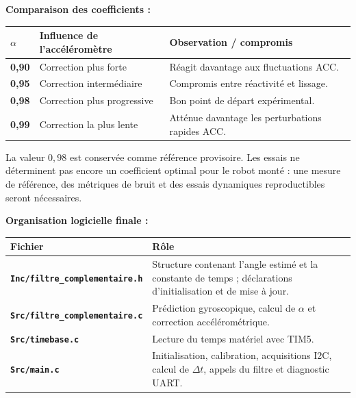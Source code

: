 \documentclass[11pt,a4paper]{article}
\begin{document}
\begin{sessionbox}
		\vspace{0.3cm}
		
		\textbf{Comparaison des coefficients :}
		
		\begin{center}
			\begin{tabular}{>{\bfseries}p{2cm}p{5cm}p{5.5cm}}
				\toprule
				\(\alpha\) & Influence de l'accéléromètre & Observation / compromis \\
				\midrule
				0,90 & Correction plus forte & Réagit davantage aux fluctuations ACC. \\
				0,95 & Correction intermédiaire & Compromis entre réactivité et lissage. \\
				0,98 & Correction plus progressive & Bon point de départ expérimental. \\
				0,99 & Correction la plus lente & Atténue davantage les perturbations rapides ACC. \\
				\bottomrule
			\end{tabular}
		\end{center}
		
		La valeur \(0{,}98\) est conservée comme référence provisoire. Les essais ne déterminent pas encore un coefficient optimal pour le robot monté : une mesure de référence, des métriques de bruit et des essais dynamiques reproductibles seront nécessaires.
		
		\vspace{0.3cm}
		
		\textbf{Organisation logicielle finale :}
		
		\begin{center}
			\begin{tabular}{>{\bfseries}p{5cm}p{8cm}}
				\toprule
				Fichier & Rôle \\
				\midrule
				\texttt{Inc/filtre\_complementaire.h} & Structure contenant l'angle estimé et la constante de temps ; déclarations d'initialisation et de mise à jour. \\
				\texttt{Src/filtre\_complementaire.c} & Prédiction gyroscopique, calcul de \(\alpha\) et correction accélérométrique. \\
				\texttt{Src/timebase.c} & Lecture du temps matériel avec TIM5. \\
				\texttt{Src/main.c} & Initialisation, calibration, acquisitions I2C, calcul de \(\Delta t\), appels du filtre et diagnostic UART. \\
				\bottomrule
			\end{tabular}
		\end{center}
		

\end{sessionbox}
\end{document}
